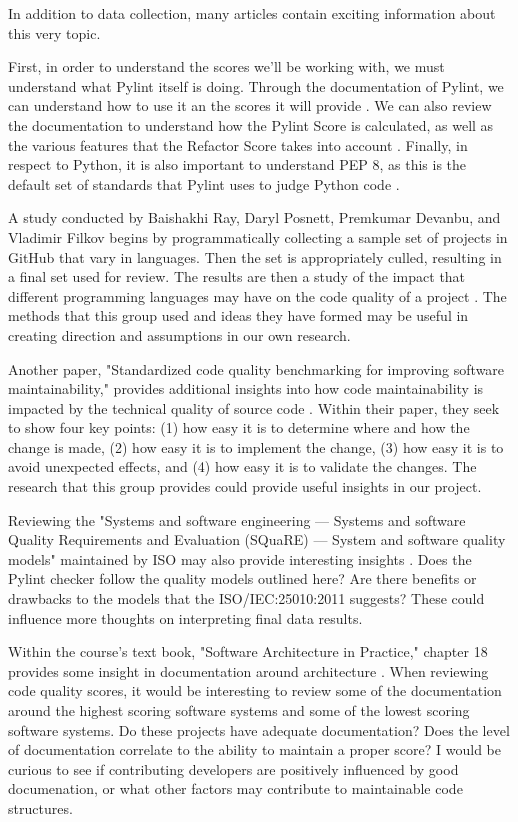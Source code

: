 \documentclass[conference]{IEEEtran}
\begin{document}
In addition to data collection, many articles contain exciting information about this very topic.

First, in order to understand the scores we'll be working with, we must understand what Pylint itself is doing. Through the documentation of Pylint, we can understand how to use it an the scores it will provide \cite{pylint:main}. We can also review the documentation to understand how the Pylint Score is calculated, as well as the various features that the Refactor Score takes into account \cite{pylint:score}. Finally, in respect to Python, it is also important to understand PEP 8, as this is the default set of standards that Pylint uses to judge Python code \cite{pylint:pep8}.

A study conducted by Baishakhi Ray, Daryl Posnett, Premkumar Devanbu, and Vladimir Filkov begins by programmatically collecting a sample set of projects in GitHub that vary in languages. Then the set is appropriately culled, resulting in a final set used for review. The results are then a study of the impact that different programming languages may have on the code quality of a project \cite{baishakhi:2017}. The methods that this group used and ideas they have formed may be useful in creating direction and assumptions in our own research.

Another paper, "Standardized code quality benchmarking for improving software maintainability," provides additional insights into how code maintainability is impacted by the technical quality of source code \cite{baggen:2012}. Within their paper, they seek to show four key points: (1) how easy it is to determine where and how the change is made, (2) how easy it is to implement the change, (3) how easy it is to avoid unexpected effects, and (4) how easy it is to validate the changes. The research that this group provides could provide useful insights in our project.

Reviewing the "Systems and software engineering — Systems and software Quality Requirements and Evaluation (SQuaRE) — System and software quality models" maintained by ISO may also provide interesting insights \cite{iso/iec:25010:2011}. Does the Pylint checker follow the quality models outlined here? Are there benefits or drawbacks to the models that the ISO/IEC:25010:2011 suggests? These could influence more thoughts on interpreting final data results.

Within the course's text book, "Software Architecture in Practice," chapter 18 provides some insight in documentation around architecture \cite{book:software-architecture-in-practice}. When reviewing code quality scores, it would be interesting to review some of the documentation around the highest scoring software systems and some of the lowest scoring software systems. Do these projects have adequate documentation? Does the level of documentation correlate to the ability to maintain a proper score? I would be curious to see if contributing developers are positively influenced by good documenation, or what other factors may contribute to maintainable code structures.

\newpage


\end{document}
